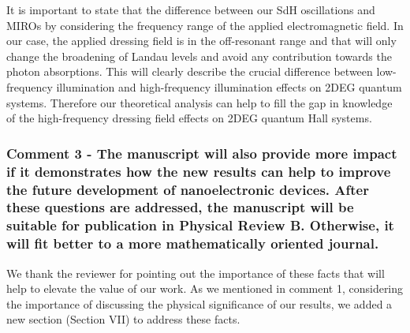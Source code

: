 \documentclass{article}
\begin{document}
\begin{itemize}
{  It is important to state that the difference between our SdH oscillations and MIROs \cite{zudov01,mani02,zudov03,mani04} by considering the frequency range of the applied electromagnetic field. In our case, the applied dressing field is in the off-resonant range and that will only change the broadening of Landau levels and avoid any contribution towards the photon absorptions. This will clearly describe the crucial difference between low-frequency illumination and high-frequency illumination effects on 2DEG quantum systems. Therefore our theoretical analysis can help to fill the gap in knowledge of the high-frequency dressing field effects on 2DEG quantum Hall systems.
  }
\end{itemize}

\subsubsection*{Comment 3 -
\color{RoyalBlue} The manuscript will also provide more impact if it demonstrates how the new results can help to improve the future development of nanoelectronic devices. After these questions are addressed, the manuscript will be suitable for publication in Physical Review B. Otherwise, it will fit better to a more mathematically oriented journal.
}

We thank the reviewer for pointing out the importance of these facts that will help to elevate the value of our work. As we mentioned in comment 1, considering the importance of discussing the physical significance of our results, we added a new section (Section VII) to address these facts.
\end{document}
